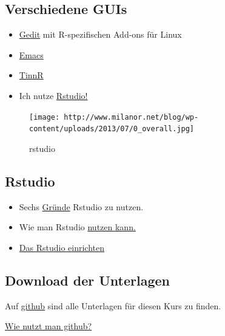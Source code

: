 \documentclass[]{article}
\begin{document}
\subsection{Verschiedene GUIs}\label{verschiedene-guis}

\begin{itemize}
\item
  \href{https://projects.gnome.org/gedit/}{Gedit} mit R-spezifischen
  Add-ons für Linux
\item
  \href{http://www.gnu.org/software/emacs/}{Emacs}
\item
  \href{http://www.sciviews.org/Tinn-R/}{TinnR}
\item
  Ich nutze \href{https://www.rstudio.com/}{Rstudio!}
\end{itemize}

\begin{figure}[htbp]
\centering
\texttt{[image: http://www.milanor.net/blog/wp-content/uploads/2013/07/0\_overall.jpg]}
\caption{rstudio}
\end{figure}

\subsection{Rstudio}\label{rstudio}

\begin{itemize}
\item
  Sechs
  \href{http://www.r-bloggers.com/top-6-reasons-you-need-to-be-using-rstudio/}{Gründe}
  Rstudio zu nutzen.
\item
  Wie man Rstudio
  \href{https://support.rstudio.com/hc/en-us/sections/200107586-Using-RStudio}{nutzen
  kann.}
\item
  \href{https://support.rstudio.com/hc/en-us/articles/200549016-Customizing-RStudio}{Das
  Rstudio einrichten}
\end{itemize}

\subsection{Download der Unterlagen}\label{download-der-unterlagen}

Auf \href{https://github.com/Japhilko/IntroR/tree/master/2017}{github}
sind alle Unterlagen für diesen Kurs zu finden.

\href{https://guides.github.com/activities/hello-world/}{Wie nutzt man
github?}
\end{document}
